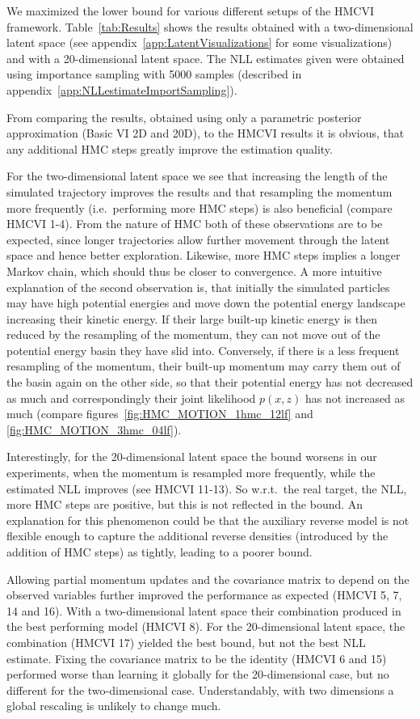 We maximized the lower bound for various different setups of the HMCVI framework. Table~\ref{tab:Results} shows the results obtained with a two-dimensional latent space (see appendix~\ref{app:LatentVisualizations} for some visualizations) and with a 20-dimensional latent space. The NLL estimates given were obtained using importance sampling with 5000 samples (described in appendix~\ref{app:NLLestimateImportSampling}).

From comparing the results, obtained using only a parametric posterior approximation (Basic VI 2D and 20D), to the HMCVI results it is obvious, that any additional HMC steps greatly improve the estimation quality. 

For the two-dimensional latent space we see that increasing the length of the simulated trajectory improves the results and that resampling the momentum more frequently (i.e.\ performing more HMC steps) is also beneficial (compare HMCVI 1-4). From the nature of HMC both of these observations are to be expected, since longer trajectories allow further movement through the latent space and hence better exploration. Likewise, more HMC steps implies a longer Markov chain, which should thus be closer to convergence. A more intuitive explanation of the second observation is, that initially the simulated particles may have high potential energies and move down the potential energy landscape increasing their kinetic energy. If their large built-up kinetic energy is then reduced by the resampling of the momentum, they can not move out of the potential energy basin they have slid into. Conversely, if there is a less frequent resampling of the momentum, their built-up momentum may carry them out of the basin again on the other side, so that their potential energy has not decreased as much and correspondingly their joint likelihood $p(x, z)$ has not increased as much (compare figures~\ref{fig:HMC_MOTION_1hmc_12lf} and \ref{fig:HMC_MOTION_3hmc_04lf}).

Interestingly, for the 20-dimensional latent space the bound worsens in our experiments, when the momentum is resampled more frequently, while the estimated NLL improves (see HMCVI 11-13). So w.r.t.\ the real target, the NLL, more HMC steps are positive, but this is not reflected in the bound. An explanation for this phenomenon could be that the auxiliary reverse model is not flexible enough to capture the additional reverse densities (introduced by the addition of HMC steps) as tightly, leading to a poorer bound.

Allowing partial momentum updates and the covariance matrix to depend on the observed variables further improved the performance as expected (HMCVI 5, 7, 14 and 16). With a two-dimensional latent space their combination produced in the best performing model (HMCVI 8). For the 20-dimensional latent space, the combination (HMCVI 17) yielded the best bound, but not the best NLL estimate. Fixing the covariance matrix to be the identity (HMCVI 6 and 15) performed worse than learning it globally for the 20-dimensional case, but no different for the two-dimensional case. Understandably, with two dimensions a global rescaling is unlikely to change much.

